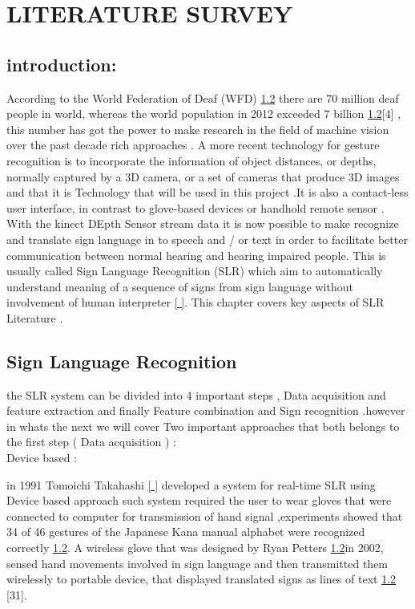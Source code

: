 

\chapter{LITERATURE SURVEY}

\section{introduction:}

According to the World Federation of Deaf (WFD) \ref{} there are 70 million deaf people in world, whereas the world population in 2012 exceeded 7 billion \ref{}[4] , this number has got the power to make research in the field of machine vision  over  the  past  decade rich  approaches .
A  more  recent   technology  for gesture   recognition  is to  incorporate   the  information   of object   distances,   or depths,   normally   captured   by a 3D camera,   or a set  of cameras  that  produce 3D images and that it is Technology that will be used in this project  .It is also a contact-less  user interface,   in contrast   to glove-based   devices  or handhold   remote  sensor .
With the kinect DEpth Sensor stream data it is now possible to make recognize and  translate sign language in to speech and / or text in order to facilitate better communication between normal hearing and hearing impaired people. This is usually called Sign Language Recognition (SLR) which  aim  to automatically understand meaning of a sequence of signs from sign language without involvement of human interpreter \ref{ }. This chapter covers key aspects of SLR Literature .





\section{ Sign  Language Recognition}  

the SLR system can be divided into 4 important  steps , Data acquisition and feature extraction and finally Feature combination and Sign recognition .however in whats the next  we will cover Two important approaches that both  belongs to the first step ( Data acquisition ) :\\

Device based :

in  1991 Tomoichi Takahashi  \ref{ } developed a system for real-time SLR  using Device based approach such system required the user to wear gloves that were connected to computer for transmission of hand signal ,experiments showed that 34 of 46 gestures of the Japanese Kana manual alphabet were recognized correctly \ref{}.
 A wireless glove that was designed by Ryan Petters  \ref{}in 2002, sensed hand movements involved in sign language and then transmitted them wirelessly to portable device, that displayed translated signs as lines of text \ref{} [31].
 

